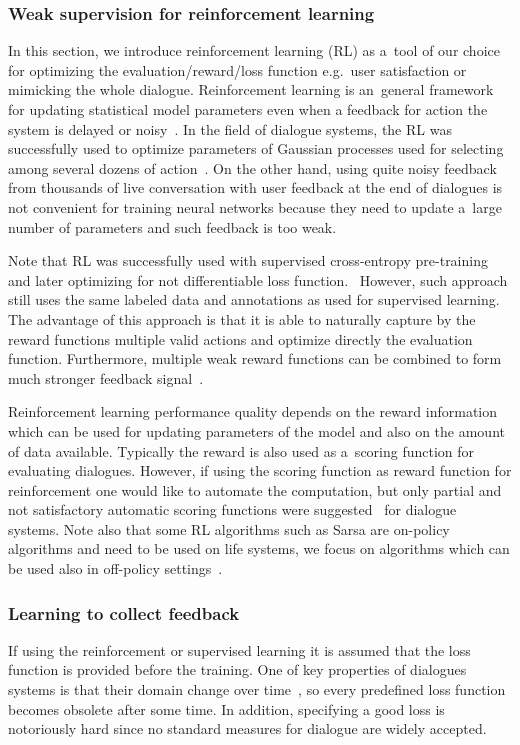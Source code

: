 \documentclass[11pt]{article}
\begin{document}
\subsubsection*{Weak supervision for reinforcement learning}\label{sub:batch_rl}

In this section, we introduce reinforcement learning (RL) as a~tool of our choice for optimizing the evaluation/reward/loss function e.g.\ user satisfaction or mimicking the whole dialogue.
Reinforcement learning is an~general framework for updating statistical model parameters even when a feedback for action the system is delayed or noisy~\cite{williams2016end,bahdanau_actor-critic_2016,wierstra_recurrent_2010}.
In the field of dialogue systems, the RL was successfully used to optimize parameters of Gaussian processes used for selecting among several dozens of action~\cite{gasic2011line}.
On the other hand, using quite noisy feedback from thousands of live conversation with user feedback at the end of dialogues is not convenient for training neural networks because they need to update a~large number of parameters and such feedback is too weak.

Note that RL was successfully used with supervised cross-entropy pre-training and later optimizing for not differentiable loss function.~\cite{williams2016end}
However, such approach still uses the same labeled data and annotations as used for supervised learning.
The advantage of this approach is that it is able to naturally capture by the reward functions multiple valid actions and optimize directly the evaluation function.
Furthermore, multiple weak reward functions can be combined to form much stronger feedback signal~\cite{abbeel_apprenticeship_2004}.

Reinforcement learning performance quality depends on the reward information which can be used for updating parameters of the model and also on the amount of data available.
Typically the reward is also used as a~scoring function for evaluating dialogues.
However, if using the scoring function as reward function for reinforcement one would like to automate the computation, but only partial and not satisfactory automatic scoring functions were suggested~\cite{liu_how_2016,lowe_evaluation_2016} for dialogue systems. 
Note also that some RL algorithms such as Sarsa are on-policy algorithms and need to be used on life systems, we focus on algorithms which can be used also in off-policy settings~\cite{sutton_reinforcement_1998}.

\subsubsection*{Learning to collect feedback}\label{sub:irl}
If using the reinforcement or supervised learning it is assumed that the loss function is provided before the training.
One of key properties of dialogues systems is that their domain change over time~\cite{yu_evolvable_2016}, so every predefined loss function becomes obsolete after some time.
In addition, specifying a good loss is notoriously hard since no standard measures for dialogue are widely accepted.
\end{document}
